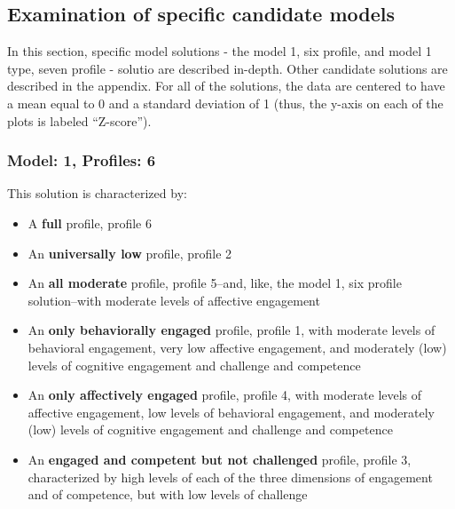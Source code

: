 \documentclass[]{msu-thesis}
\providecommand{\tightlist}{%
  \setlength{\itemsep}{0pt}\setlength{\parskip}{0pt}}
\theoremstyle{definition}
\theoremstyle{definition}
\theoremstyle{definition}
\theoremstyle{remark}
\begin{document}
\subsection{Examination of specific candidate
models}\label{examination-of-specific-candidate-models}

In this section, specific model solutions - the model 1, six profile,
and model 1 type, seven profile - solutio are described in-depth. Other
candidate solutions are described in the appendix. For all of the
solutions, the data are centered to have a mean equal to 0 and a
standard deviation of 1 (thus, the y-axis on each of the plots is
labeled ``Z-score'').

\subsubsection{Model: 1, Profiles: 6}\label{model-1-profiles-6}

This solution is characterized by:

\begin{itemize}
\tightlist
\item
  A \textbf{full} profile, profile 6
\item
  An \textbf{universally low} profile, profile 2
\item
  An \textbf{all moderate} profile, profile 5--and, like, the model 1,
  six profile solution--with moderate levels of affective engagement
\item
  An \textbf{only behaviorally engaged} profile, profile 1, with
  moderate levels of behavioral engagement, very low affective
  engagement, and moderately (low) levels of cognitive engagement and
  challenge and competence
\item
  An \textbf{only affectively engaged} profile, profile 4, with moderate
  levels of affective engagement, low levels of behavioral engagement,
  and moderately (low) levels of cognitive engagement and challenge and
  competence
\item
  An \textbf{engaged and competent but not challenged} profile, profile
  3, characterized by high levels of each of the three dimensions of
  engagement and of competence, but with low levels of challenge
\end{itemize}
\end{document}
